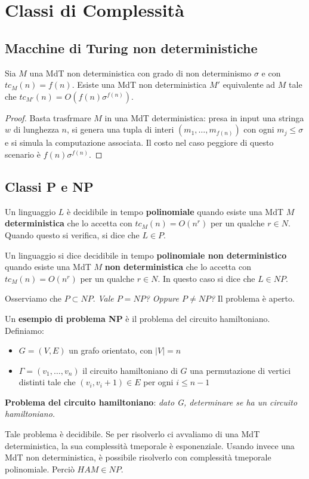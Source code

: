 \section{Classi di Complessità}

\subsection{Macchine di Turing non deterministiche}

\begin{lemm}
	Sia $M$ una MdT non deterministica con grado di non determinismo $\sigma$ e con $tc_M(n) = f(n)$. Esiste una MdT non deterministica $M'$ equivalente ad $M$ tale che $tc_{M'}(n) = O(f(n)\sigma^{f(n)})$.
\end{lemm}

\begin{proof}
	Basta trasfrmare $M$ in una MdT deterministica: presa in input una stringa $w$ di lunghezza $n$, si genera una tupla di interi $(m_1, \ldots, m_{f(n)})$ con ogni $m_j \leq \sigma$ e si simula la computazione associata. Il costo nel caso peggiore di questo scenario è $f(n)\sigma^{f(n)}$.
\end{proof}

\subsection{Classi P e NP}

\begin{defn}
	Un linguaggio $L$ è decidibile in tempo \textbf{polinomiale} quando esiste una MdT $M$ \textbf{deterministica} che lo accetta con $tc_M(n) = O(n^r)$ per un qualche $r \in N$. Quando questo si verifica, si dice che $L \in P$.
\end{defn}

\begin{defn}
	Un linguaggio si dice decidibile in tempo \textbf{polinomiale non deterministico} quando esiste una MdT $M$ \textbf{non deterministica} che lo accetta con $tc_M(n) = O(n^r)$ per un qualche $r \in N$. In questo caso si dice che $L \in NP$.
\end{defn}

Osserviamo che $P \subset NP$. \textit{Vale $P = NP$? Oppure $P \neq NP$?} Il problema è aperto.

Un \textbf{esempio di problema NP} è il problema del circuito hamiltoniano. Definiamo:

\begin{itemize}
	\item $G = (V, E)$ un grafo orientato, con $|V| = n$
	\item $\Gamma = (v_1, \ldots, v_n)$ il circuito hamiltoniano di $G$
		\subitem una permutazione di vertici distinti tale che $(v_i, v_i+1) \in E$ per ogni $i \leq n-1$
\end{itemize}

\textbf{Problema del circuito hamiltoniano}: \textit{dato G, determinare se ha un circuito hamiltoniano.}

Tale problema è decidibile. Se per risolverlo ci avvaliamo di una MdT deterministica, la sua complessità tmeporale è esponenziale. Usando invece una MdT non deterministica, è possibile risolverlo con complessità tmeporale polinomiale. Perciò $HAM \in NP$.
